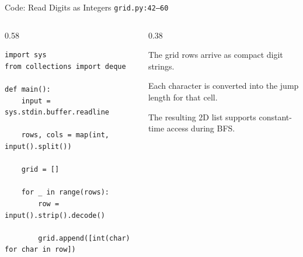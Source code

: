 \documentclass[aspectratio=169,11pt]{beamer}
\begin{document}
\begin{frame}[fragile]{Code: Read Digits as Integers}
\scriptsize
{} \texttt{grid.py:42--60}

\vspace{0.08cm}
\begin{columns}[T,totalwidth=\textwidth]
\begin{column}{0.58\textwidth}
\begin{lstlisting}[style=cpcode]
import sys
from collections import deque

def main():
    input = sys.stdin.buffer.readline

    rows, cols = map(int, input().split())

    grid = []

    for _ in range(rows):
        row = input().strip().decode()

        grid.append([int(char) for char in row])
\end{lstlisting}
\end{column}
\begin{column}{0.38\textwidth}
\begin{tightitemize}
  \item The grid rows arrive as compact digit strings.
  \item Each character is converted into the jump length for that cell.
  \item The resulting 2D list supports constant-time access during BFS.
\end{tightitemize}
\end{column}
\end{columns}
\end{frame}
\end{document}
